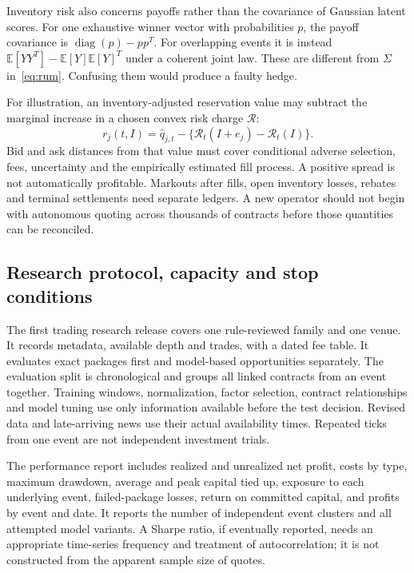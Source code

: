 \documentclass[11pt]{article}
\newcommand{\E}{\mathbb E}
\newcommand{\diag}{\operatorname{diag}}
\theoremstyle{remark}\newtheorem{example}{Example}
\begin{document}
Inventory risk also concerns payoffs rather than the covariance of Gaussian
latent scores. For one exhaustive winner vector with probabilities $p$, the
payoff covariance is $\diag(p)-pp^T$. For overlapping events it is instead
$\E[YY^T]-\E[Y]\E[Y]^T$ under a coherent joint law. These are different from
$\Sigma$ in~\eqref{eq:rum}. Confusing them would produce a faulty hedge.

For illustration, an inventory-adjusted reservation value may subtract the
marginal increase in a chosen convex risk charge $\mathcal R$:
\begin{equation}
 r_j(t,I)=\widehat q_{j,t}
 -\{\mathcal R_t(I+e_j)-\mathcal R_t(I)\}.
\end{equation}
Bid and ask distances from that value must cover conditional adverse selection,
fees, uncertainty and the empirically estimated fill process. A positive spread
is not automatically profitable. Markouts after fills, open inventory losses,
rebates and terminal settlements need separate ledgers. A new operator should
not begin with autonomous quoting across thousands of contracts before those
quantities can be reconciled.

\subsection{Research protocol, capacity and stop conditions}
The first trading research release covers one rule-reviewed family and one
venue. It records metadata, available depth and trades, with a dated fee table.
It evaluates exact packages first and model-based opportunities separately.
The evaluation split is chronological and groups all linked contracts from
an event together. Training windows, normalization, factor selection, contract
relationships and model tuning use only information available before the test
decision. Revised data and late-arriving news use their actual availability
times. Repeated ticks from one event are not independent investment trials.

The performance report includes realized and unrealized net profit, costs by
type, maximum drawdown, average and peak capital tied up, exposure to each
underlying event, failed-package losses, return on committed capital, and
profits by event and date. It reports the number of independent event clusters
and all attempted model variants. A Sharpe ratio, if eventually reported, needs
an appropriate time-series frequency and treatment of autocorrelation; it is
not constructed from the apparent sample size of quotes.
\end{document}
